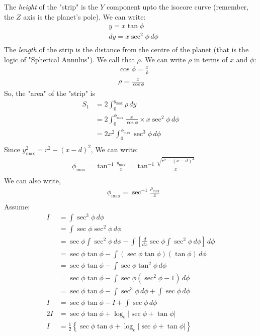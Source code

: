 \documentclass[12pt]{extarticle}
\begin{document}
The \textit{height} of the "strip" is the $Y$ component upto the isocore curve (remember, the $Z$ axis is the planet's pole). We can write:
    \begin{align*} 
        & y = x \tan \phi \\
        &dy = x \sec^2 \phi \,d\phi \\
    \end{align*}
The \textit{length} of the strip is the distance from the centre of the planet (that is the logic of "Spherical Annulus"). We call that $\rho$. We can write $\rho$ in terms of $x$ and $\phi$:
    \begin{align*} 
        &\cos \phi = \frac{x}{\rho} \\
        &\rho = \frac{x}{\cos \phi}
    \end{align*}
So, the "area" of the "strip" is
    \begin{align*} 
        S_1 &= 2 \int_{0}^{y_{\max}} \rho \,dy \\
        &= 2 \int_{0}^{\phi_{\max}} \frac{x}{\cos \phi} \times x \sec^2 \phi \,d\phi \\
        &= 2x^2 \int_{0}^{\phi_{\max}} \sec^3 \phi \,d\phi \\
    \end{align*}
Since $y_{\max}^2 = r^2 - (x-d)^2$, We can write:
    \begin{align*} 
        &\phi_{\max}= \tan^{-1} \frac{y_{\max}}{x} = \tan^{-1} \frac{\sqrt{r^2 - (x-d)^2}}{x} \\
    \end{align*}
We can also write,
    \begin{align*} 
        &\phi_{\max} =  \sec^{-1} \frac{\rho_{\max}}{x}  \\
    \end{align*}
Assume: \begin{align*} 
        I &= \int \sec^3 \phi \,d\phi \\
        &= \int \sec \phi \sec^2 \phi \,d\phi \\
        &= \sec \phi \int \sec^2 \phi \,d\phi - \int \left[ \frac{d}{dx} \sec \phi \int \sec^2 \phi \,d\phi \right] \,d\phi \\
        &= \sec \phi \tan \phi  - \int (\sec \phi \tan \phi) (\tan \phi) \,d\phi \\
        &= \sec \phi \tan \phi  - \int \sec \phi \tan^2 \phi \,d\phi \\
        &= \sec \phi \tan \phi  -  \int \sec \phi (\sec^2 \phi -1) \,d\phi \\
        &= \sec \phi \tan \phi  - \int \sec^3 \phi \,d\phi + \int \sec \phi \,d\phi \\
        I &= \sec \phi \tan \phi  -I + \int \sec \phi \,d\phi \\
        2I &= \sec \phi \tan \phi + \log_e \left|\sec \phi + \tan \phi \right| \\
        I &= \frac{1}{2} \left\{  \sec \phi \tan \phi + \log_e \left|\sec \phi + \tan \phi \right|\right\}
    \end{align*}
\end{document}
